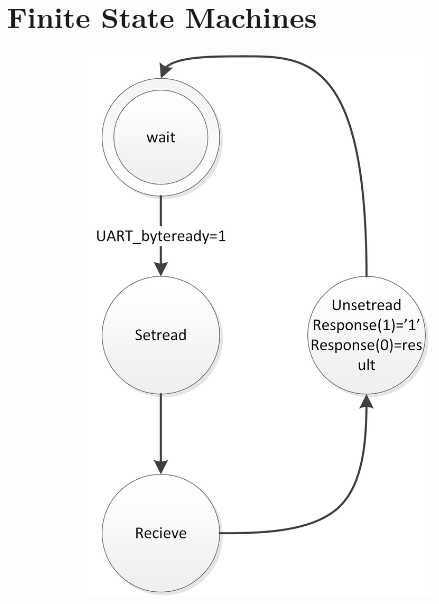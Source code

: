\documentclass{report}
\begin{document}
\section{Finite State Machines}
\label{sec:statemachines}
\begin{figure}[H]
\centering
\caption{De FSM's op de FPGA}
\begin{subfigure}{0.20\linewidth}
\label{fig:fsmReceiver}
\includegraphics[width=\linewidth]{FSMReceiver}
\end{subfigure}
\quad
\begin{subfigure}{0.50\linewidth}
\label{fig:fsmMain}

\end{subfigure}
\end{figure}
\end{document}
